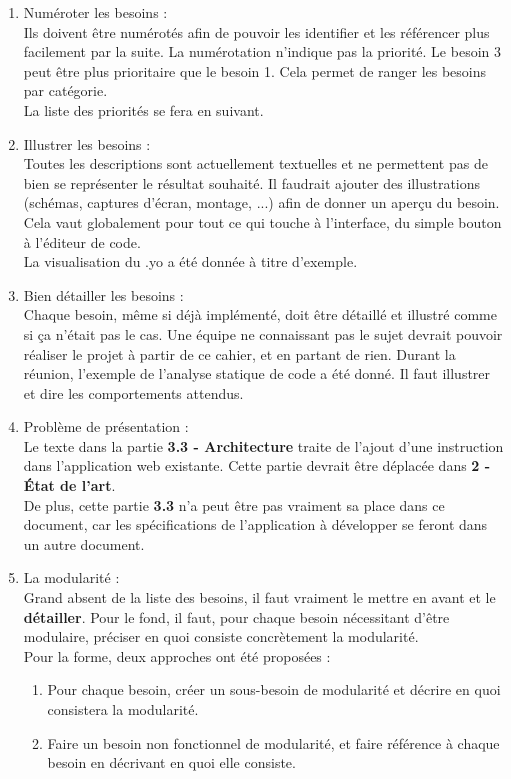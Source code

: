 \documentclass[french]{article}
\begin{document}
\begin{enumerate}
    \item Numéroter les besoins :\\
    Ils doivent être numérotés afin de pouvoir les identifier et les référencer plus facilement par la suite. La numérotation n'indique pas la priorité. Le besoin 3 peut être plus prioritaire que le besoin 1. Cela permet de ranger les besoins par catégorie.\\
    La liste des priorités se fera en suivant.
    \\
    \item Illustrer les besoins :\\
    Toutes les descriptions sont actuellement textuelles et ne permettent pas de bien se représenter le résultat souhaité. Il faudrait ajouter des illustrations (schémas, captures d'écran, montage, ...) afin de donner un aperçu du besoin. Cela vaut globalement pour tout ce qui touche à l'interface, du simple bouton à l'éditeur de code.\\
    La visualisation du .yo a été donnée à titre d'exemple.
    \\
    \item Bien détailler les besoins :\\
    Chaque besoin, même si déjà implémenté, doit être détaillé et illustré comme si ça n'était pas le cas. Une équipe ne connaissant pas le sujet devrait pouvoir réaliser le projet à partir de ce cahier, et en partant de rien. Durant la réunion, l'exemple de l'analyse statique de code a été donné. Il faut illustrer et dire les comportements attendus.
    \\
    \item Problème de présentation :\\
    Le texte dans la partie \textbf{3.3 - Architecture} traite de l'ajout d'une instruction dans l'application web existante. Cette partie devrait être déplacée dans \textbf{2 - État de l'art}.\\
    De plus, cette partie \textbf{3.3} n'a peut être pas vraiment sa place dans ce document, car les spécifications de l'application à développer se feront dans un autre document.
    \\
    \item La modularité :\\
    Grand absent de la liste des besoins, il faut vraiment le mettre en avant et le \textbf{détailler}. Pour le fond, il faut, pour chaque besoin nécessitant d'être modulaire, préciser en quoi consiste concrètement la modularité.\\
    Pour la forme, deux approches ont été proposées :
    \begin{enumerate}
        \item Pour chaque besoin, créer un sous-besoin de modularité et décrire en quoi consistera la modularité.
        \item Faire un besoin non fonctionnel de modularité, et faire référence à chaque besoin en décrivant en quoi elle consiste. 
        \\
    \end{enumerate}
    

\end{enumerate}
\end{document}
